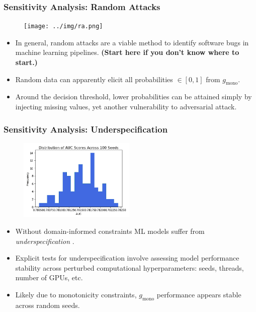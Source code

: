 \documentclass[11pt,
               aspectratio=169,
               hyperref={colorlinks}
               ]{beamer}
\begin{document}
			\begin{frame}[t]
		
		
				\frametitle{\textbf{Sensitivity Analysis}: Random Attacks}
				\vspace{-15pt}
				\begin{figure}
					\begin{center}
						\texttt{[image: ../img/ra.png]}
					\end{center}
				\end{figure}	
				\vspace{-10pt}
				\begin{itemize}\scriptsize
					\item In general, random attacks are a viable method to identify software bugs in machine learning pipelines. \textbf{(Start here if you don't know where to start.)}
					\item Random data can apparently elicit all probabilities $\in [0, 1]$ from $g_{\text{mono}}$.
					\item Around the decision threshold, lower probabilities can be attained simply by injecting missing values, yet another vulnerability to adversarial attack.
				\end{itemize}
				\normalsize
		
			\end{frame}

			\begin{frame}[t]
				
				\frametitle{\textbf{Sensitivity Analysis}: Underspecification}
				\vspace{-15pt}
				\begin{figure}
					\begin{center}
						\includegraphics[height=110pt]{../img/under_spec.png}
					\end{center}
				\end{figure}	
				\vspace{-10pt}
				\begin{itemize}\scriptsize
					\item Without domain-informed constraints ML models suffer from  \textit{underspecification} \cite{underspec}.
					\item Explicit tests for underspecification involve assessing model performance stability across perturbed computational hyperparameters: seeds, threads, number of GPUs, etc.
					\item Likely due to monotonicity constraints, $g_{\text{mono}}$ performance appears stable across random seeds. 
				\end{itemize}
				\normalsize
				
			\end{frame}
			
\end{document}
